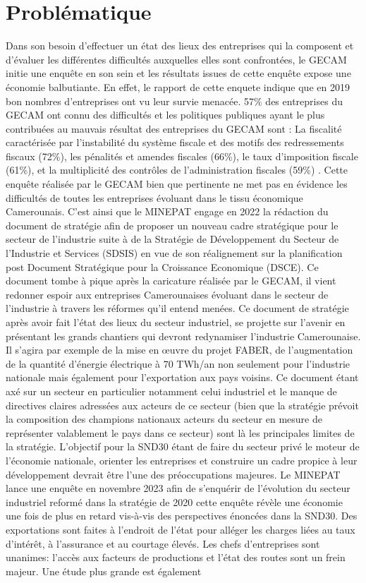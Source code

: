 \documentclass[12pt, a4paper, oneside]{report}
\begin{document}
\section*{Problématique}

Dans son besoin d’effectuer un état des lieux des entreprises qui la composent et d’évaluer les différentes difficultés auxquelles elles sont confrontées, le GECAM initie une enquête en son sein et les résultats issues de cette enquête expose une économie balbutiante. En effet, le rapport de cette enquete indique que en 2019 bon nombres d’entreprises ont vu leur survie menacée. 57\% des entreprises du GECAM ont connu des difficultés et les politiques publiques ayant le plus contribuées au mauvais résultat des entreprises du GECAM sont : La fiscalité caractérisée par l’instabilité du système fiscale et des motifs des redressements fiscaux (72\%), les pénalités et amendes fiscales (66\%), le taux d’imposition fiscale (61\%), et la multiplicité des contrôles de l’administration fiscales (59\%) \citep{barometr_gecam}.  Cette enquête réalisée par le GECAM bien que pertinente ne met pas en évidence les difficultés de toutes les entreprises évoluant dans le tissu économique Camerounais. C’est ainsi que le MINEPAT engage en 2022 la rédaction du document de stratégie afin de proposer un nouveau cadre stratégique pour le secteur de l’industrie suite à de la Stratégie de Développement du Secteur de l’Industrie et Services (SDSIS) en vue de son réalignement sur la planification post Document Stratégique pour la Croissance Economique (DSCE). Ce document tombe à pique après la caricature réalisée par le GECAM, il vient redonner espoir aux entreprises Camerounaises évoluant dans le secteur de l’industrie à travers les réformes qu’il entend menées. Ce document de stratégie après avoir fait l’état des lieux du secteur industriel, se projette sur l’avenir en présentant les grands chantiers qui devront redynamiser l’industrie Camerounaise. Il s’agira par exemple de la mise en œuvre du projet FABER, de l’augmentation de la quantité d’énergie électrique à 70 TWh/an non seulement pour l’industrie nationale mais également pour l’exportation aux pays voisins. Ce document étant axé sur un secteur en particulier notamment celui industriel et le manque de directives claires adressées aux acteurs de ce secteur (bien que la stratégie prévoit la composition des champions nationaux acteurs du secteur en mesure de représenter valablement le pays dans ce secteur) sont là les principales limites de la stratégie. L’objectif pour la SND30 étant de faire du secteur privé le moteur de l’économie nationale, orienter les entreprises et construire un cadre propice à leur développement devrait être l’une des préoccupations majeures. Le MINEPAT lance une enquête en novembre 2023 afin de s’enquérir de l’évolution du secteur industriel reformé dans la stratégie de 2020 cette enquête révèle une économie une fois de plus en retard vis-à-vis des perspectives énoncées dans la SND30. Des exportations sont faites à l’endroit de l’état pour alléger les charges liées au taux d’intérêt, à l’assurance et au courtage élevés. Les chefs d’entreprises sont unanimes: l’accès aux facteurs de productions et l’état des routes sont un frein majeur. Une étude plus grande est également 
\end{document}
